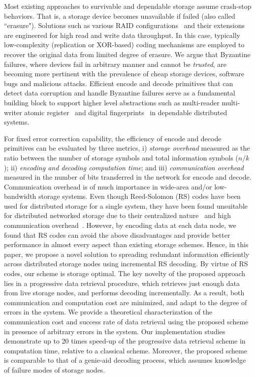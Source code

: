 \documentclass[10pt,journal,letterpaper,compsoc]{IEEEtran}
\newcommand{\0}{{\bf 0}}
\begin{document}
Most existing approaches to survivable and dependable storage assume crash-stop behaviors.
That is, a storage device becomes unavailable if failed (also called ``erasure").
Solutions such as various RAID configurations~\cite{raid} and their extensions
are engineered for high read and write data throughput. In this case, typically
low-complexity (replication or XOR-based) coding mechanisms are employed to
recover the original data from limited degree of erasure. We argue that Byzantine failures, where
devices fail in arbitrary manner and cannot be \emph{trusted}, are becoming more
pertinent with the prevalence of cheap storage devices, software bugs and
malicious attacks. Efficient encode and decode primitives that can detect data
corruption and handle Byzantine failures serve as a fundamental building block to
support higher level abstractions such as multi-reader multi-writer atomic
register~\cite{Goodson04} and digital fingerprints~\cite{Krawczyk93} in dependable distributed systems. 

For fixed error correction capability, the efficiency of encode and decode
primitives can be evaluated by three metrics, i) {\it storage overhead}
measured as the ratio between the number of storage symbols and total
information symbols ($n/k$); ii) {\it encoding and decoding computation time};
and iii) {\it communication overhead} measured in the number of bits
transferred in the network for encode and decode. Communication overhead is of
much importance in wide-area and/or low-bandwidth storage systems. Even though Reed-Solomon (RS) codes have been used for distributed storage for a single system, they have been found unsuitable for distributed networked storage due to their centralized nature~\cite{DIM06} and high communication overhead~\cite{lin2007dpl}. However, by encoding data at each data node, we found that RS codes can avoid the above disadvantages and provide better performance in almost every aspect than existing storage schemes. Hence, in this
paper, we propose a novel solution to spreading redundant information efficiently
across distributed storage nodes using incremental RS decoding.
By virtue of RS codes, our scheme is storage optimal. The key novelty of the proposed
approach lies in a progressive data retrieval procedure, which retrieves
just enough data from live storage nodes, and performs decoding
incrementally.  As a result, both communication and computation cost are
minimized, and adapt to the degree of errors in the system. We
provide a theoretical characterization of the communication cost and success
rate of data retrieval using the proposed scheme in presence of arbitrary
errors in the system. Our implementation studies demonstrate up to 20 times
speed-up of the progressive data retrieval scheme in computation time, relative
to a classical scheme. Moreover, the proposed scheme is comparable to that of a
genie-aid decoding process, which assumes knowledge of failure modes of storage
nodes.
\end{document}
